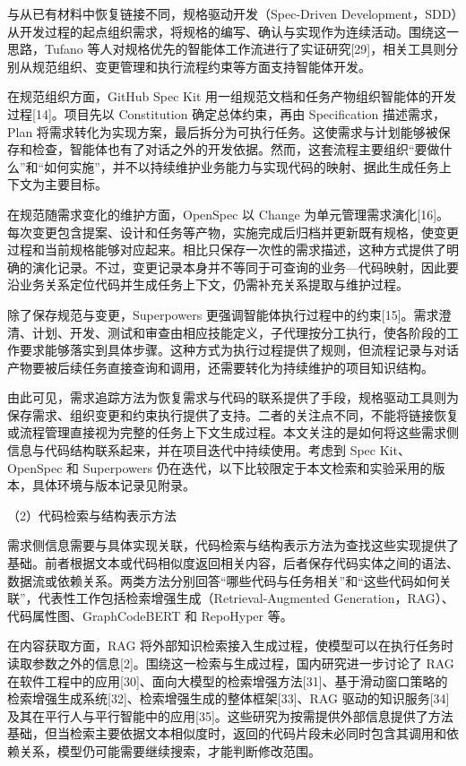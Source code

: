 与从已有材料中恢复链接不同，规格驱动开发（Spec-Driven Development，SDD）从开发过程的起点组织需求，将规格的编写、确认与实现作为连续活动。围绕这一思路，Tufano 等人对规格优先的智能体工作流进行了实证研究[29]，相关工具则分别从规范组织、变更管理和执行流程约束等方面支持智能体开发。

在规范组织方面，GitHub Spec Kit 用一组规范文档和任务产物组织智能体的开发过程[14]。项目先以 Constitution 确定总体约束，再由 Specification 描述需求，Plan 将需求转化为实现方案，最后拆分为可执行任务。这使需求与计划能够被保存和检查，智能体也有了对话之外的开发依据。然而，这套流程主要组织“要做什么”和“如何实施”，并不以持续维护业务能力与实现代码的映射、据此生成任务上下文为主要目标。

在规范随需求变化的维护方面，OpenSpec 以 Change 为单元管理需求演化[16]。每次变更包含提案、设计和任务等产物，实施完成后归档并更新既有规格，使变更过程和当前规格能够对应起来。相比只保存一次性的需求描述，这种方式提供了明确的演化记录。不过，变更记录本身并不等同于可查询的业务—代码映射，因此要沿业务关系定位代码并生成任务上下文，仍需补充关系提取与维护过程。

除了保存规范与变更，Superpowers 更强调智能体执行过程中的约束[15]。需求澄清、计划、开发、测试和审查由相应技能定义，子代理按分工执行，使各阶段的工作要求能够落实到具体步骤。这种方式为执行过程提供了规则，但流程记录与对话产物要被后续任务直接查询和调用，还需要转化为持续维护的项目知识结构。

由此可见，需求追踪方法为恢复需求与代码的联系提供了手段，规格驱动工具则为保存需求、组织变更和约束执行提供了支持。二者的关注点不同，不能将链接恢复或流程管理直接视为完整的任务上下文生成过程。本文关注的是如何将这些需求侧信息与代码结构联系起来，并在项目迭代中持续使用。考虑到 Spec Kit、OpenSpec 和 Superpowers 仍在迭代，以下比较限定于本文检索和实验采用的版本，具体环境与版本记录见附录。

（2）代码检索与结构表示方法

需求侧信息需要与具体实现关联，代码检索与结构表示方法为查找这些实现提供了基础。前者根据文本或代码相似度返回相关内容，后者保存代码实体之间的语法、数据流或依赖关系。两类方法分别回答“哪些代码与任务相关”和“这些代码如何关联”，代表性工作包括检索增强生成（Retrieval-Augmented Generation，RAG）、代码属性图、GraphCodeBERT 和 RepoHyper 等。

在内容获取方面，RAG 将外部知识检索接入生成过程，使模型可以在执行任务时读取参数之外的信息[2]。围绕这一检索与生成过程，国内研究进一步讨论了 RAG 在软件工程中的应用[30]、面向大模型的检索增强方法[31]、基于滑动窗口策略的检索增强生成系统[32]、检索增强生成的整体框架[33]、RAG 驱动的知识服务[34]及其在平行人与平行智能中的应用[35]。这些研究为按需提供外部信息提供了方法基础，但当检索主要依据文本相似度时，返回的代码片段未必同时包含其调用和依赖关系，模型仍可能需要继续搜索，才能判断修改范围。

